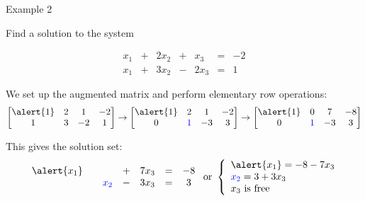 \documentclass[xcolor=dvipsnames,aspectratio=169,t]{beamer}
\begin{document}
\begin{frame}{Example 2}

  Find a solution to the system
  
\[   \begin{array}{ccccccc}
    x_1 & + & 2x_2 & + & x_3&=&-2\\
    x_1 & + & 3x_2 & - & 2x_3 &=& 1
\end{array}  %
\]

\vfill


We set up the augmented matrix and perform elementary row operations:
\[ \begin{bmatrix}
  \alert{1} & 2 & 1 & -2 \\
  1 & 3 & -2 & 1
  \end{bmatrix} \rightarrow
\begin{bmatrix}
  \alert{1} & 2 & 1 & -2 \\
  0 & \colorb{1} & -3 & 3
\end{bmatrix} \rightarrow
\begin{bmatrix}
  \alert{1} & 0 & 7 & -8  \\
  0 & \colorb{1} & -3 & 3
  \end{bmatrix} \]

\vfill

This gives the solution set:
\[  \begin{array}{ccccccc}
    \alert{x_1} &  & & + & 7x_3&=&-8\\
     &  & \colorb{x_2} & - & 3x_3 &=& 3
\end{array}
\mbox{ or }
\left\{ \begin{array}{l}
  \alert{x_1} = -8 - 7x_3\\
  \colorb{x_2} = 3+3x_3 \\ 
  x_3 \mbox{ is free}  \end{array} \right. \]

\end{frame}
\end{document}
